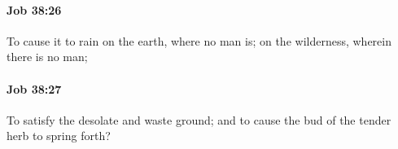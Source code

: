 		\paragraph{Job 38:26} %
			\label{JOB-38-26}

			To cause it to rain on the earth, where no man is; on the wilderness, wherein there is no man;


		\paragraph{Job 38:27} %
			\label{JOB-38-27}

			To satisfy the desolate and waste ground; and to cause the bud of the tender herb to spring forth?


